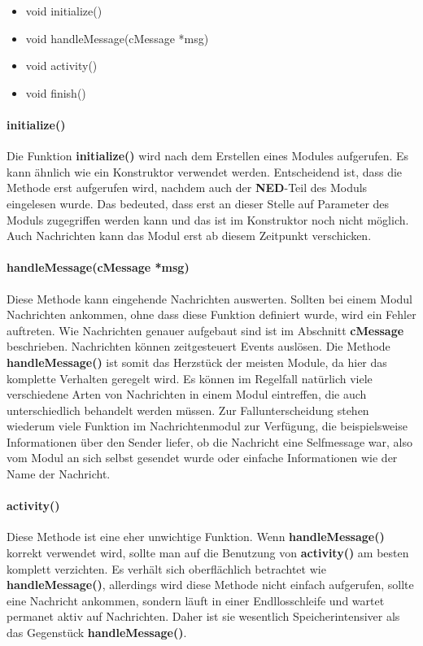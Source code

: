 \begin{itemize}
\item void initialize()
\item void handleMessage(cMessage *msg)
\item void activity()
\item void finish()
\end{itemize}

\paragraph{initialize()}

Die Funktion \textbf{initialize()} wird nach dem Erstellen eines Modules aufgerufen. Es kann ähnlich wie ein Konstruktor verwendet werden. Entscheidend ist, dass die Methode erst aufgerufen wird, nachdem auch der \textbf{NED}-Teil des Moduls eingelesen wurde. Das bedeuted, dass erst an dieser Stelle auf Parameter des Moduls zugegriffen werden kann und das ist im Konstruktor noch nicht möglich. Auch Nachrichten kann das Modul erst ab diesem Zeitpunkt verschicken. 

\paragraph{handleMessage(cMessage *msg)}

Diese Methode kann eingehende Nachrichten auswerten. Sollten bei einem Modul Nachrichten ankommen, ohne dass diese Funktion definiert wurde, wird ein Fehler auftreten. Wie Nachrichten genauer aufgebaut sind ist im Abschnitt \textbf{cMessage} beschrieben.
Nachrichten können zeitgesteuert Events auslösen. Die Methode \textbf{handleMessage()} ist somit das Herzstück der meisten Module, da hier das komplette Verhalten geregelt wird. \newline
Es können im Regelfall natürlich viele verschiedene Arten von Nachrichten in einem Modul eintreffen, die auch unterschiedlich behandelt werden müssen. Zur Fallunterscheidung stehen wiederum viele Funktion im Nachrichtenmodul zur Verfügung, die beispielsweise Informationen über den Sender liefer, ob die Nachricht eine Selfmessage war, also vom Modul an sich selbst gesendet wurde oder einfache Informationen wie der Name der Nachricht.

\paragraph{activity()}

Diese Methode ist eine eher unwichtige Funktion. Wenn \textbf{handleMessage()} korrekt verwendet wird, sollte man auf die Benutzung von \textbf{activity()} am besten komplett verzichten. Es verhält sich oberflächlich betrachtet wie \textbf{handleMessage()}, allerdings wird diese Methode nicht einfach aufgerufen, sollte eine Nachricht ankommen, sondern läuft in einer Endllosschleife und wartet permanet aktiv auf Nachrichten. Daher ist sie wesentlich Speicherintensiver als das Gegenstück \textbf{handleMessage()}.

